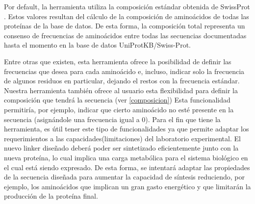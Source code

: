 Por default, la herramienta utiliza la composición estándar obtenida de SwissProt \cite{compositionAA}.  
Estos valores resultan del cálculo de la composición de aminoácidos de todas las proteínas de la base de datos. 
De esta forma, la composición total representa un consenso de frecuencias de aminoácidos entre todas las secuencias documentadas hasta el momento en la base de datos UniProtKB/Swiss-Prot.

Entre otras que existen, esta herramienta ofrece la posibilidad de definir las frecuencias que desea para cada aminoácido e, incluso,
indicar solo la frecuencia de algunos residuos en particular, dejando el restos con la frecuencia estándar. 
Nuestra herramienta también ofrece al usuario esta flexibilidad para definir la composición que tendrá la secuencia (ver \ref{composicion})
Esta funcionalidad permitiría, por ejemplo, indicar que cierto aminoácido no esté presente en la secuencia (asignándole una frecuencia igual a 0). 
Para el fin que tiene la herramienta, es útil tener este tipo de funcionalidades ya que permite adaptar los requerimientos a las capacidades(limitaciones) del laboratorio experimental. 
El nuevo linker diseñado deberá poder ser sintetizado eficientemente junto con la nueva proteína, lo cual implica una carga metabólica para el sistema biológico en el cual está siendo expresado. 
De esta forma, se intentará adaptar las propiedades de la secuencia diseñada para aumentar la capacidad de síntesis reduciendo, por ejemplo, los aminoácidos que implican un gran gasto energético
y que limitarán la producción de la proteína final.







